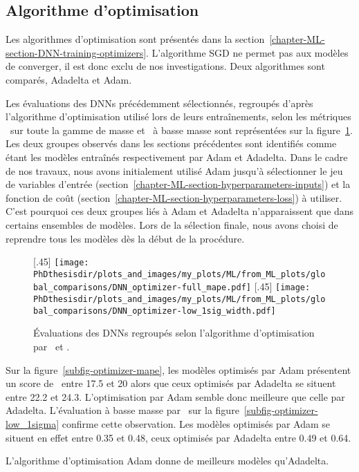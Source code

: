 \subsection{Algorithme d'optimisation}\label{chapter-ML-section-hyperparameters-opti}
Les algorithmes d'optimisation sont présentés dans la section~\ref{chapter-ML-section-DNN-training-optimizers}.
L'algorithme SGD ne permet pas aux modèles de converger, il est donc exclu de nos investigations.
Deux algorithmes sont comparés, Adadelta et Adam.
\par
Les évaluations des DNNs précédemment sélectionnés,
regroupés d'après l'algorithme d'optimisation utilisé lors de leurs entraînements,
selon les métriques
\LossMAPE\ sur toute la gamme de masse et \OneSigmaWidth\ à basse masse
sont représentées sur la figure~\ref{fig-optimizer}.
Les deux groupes observés dans les sections précédentes sont identifiés comme étant les modèles entraînés respectivement par Adam et Adadelta.
Dans le cadre de nos travaux, nous avons initialement utilisé Adam jusqu'à sélectionner
le jeu de variables d'entrée (section~\ref{chapter-ML-section-hyperparameters-inputs})
et
la fonction de coût (section~\ref{chapter-ML-section-hyperparameters-loss}) à utiliser.
C'est pourquoi ces deux groupes liés à Adam et Adadelta n'apparaissent que dans certains ensembles de modèles.
Lors de la sélection finale, nous avons choisi de reprendre tous les modèles dès la début de la procédure.
\begin{figure}[h]
\centering

\subcaptionbox{\label{subfig-optimizer-mape}}[.45\textwidth]
{\texttt{[image: \\PhDthesisdir/plots\_and\_images/my\_plots/ML/from\_ML\_plots/global\_comparisons/DNN\_optimizer-full\_mape.pdf]}\vspace{-\baselineskip}}
\hfill
\subcaptionbox{\label{subfig-optimizer-low_1sigma}}[.45\textwidth]
{\texttt{[image: \\PhDthesisdir/plots\_and\_images/my\_plots/ML/from\_ML\_plots/global\_comparisons/DNN\_optimizer-low\_1sig\_width.pdf]}\vspace{-\baselineskip}}

\caption{Évaluations des DNNs regroupés selon l'algorithme d'optimisation par \LossMAPE\ et \OneSigmaWidth.}
\label{fig-optimizer}
\end{figure}
\par
Sur la figure~\ref{subfig-optimizer-mape},
les modèles optimisés par Adam présentent un score de \LossMAPE\
entre \num{17.5} et \num{20}
alors que ceux optimisés par Adadelta se situent
entre \num{22.2} et \num{24.3}.
L'optimisation par Adam semble donc meilleure que celle par Adadelta.
L'évaluation à basse masse par \OneSigmaWidth\ sur la figure~\ref{subfig-optimizer-low_1sigma}
confirme cette observation.
Les modèles optimisés par Adam se situent en effet
entre \num{0.35} et \num{0.48},
ceux optimisés par Adadelta
entre \num{0.49} et \num{0.64}.
\par
L'algorithme d'optimisation Adam donne de meilleurs modèles qu'Adadelta.

